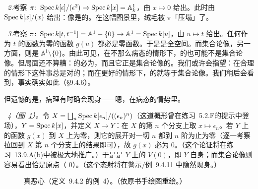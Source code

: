 \emph{\trhExample{}~2.}\quad 考察 $\pi\colon\operatorname{Spec} k[\epsilon]/(\epsilon^2)\to\operatorname{Spec} k[x]=\mathbb{A}^1_k$，由 $x\mapsto 0$ 给出。此时\trSchemeTheoreticImage{}由 $\operatorname{Spec} k[x]/(x)$ 给出：像是\trReduced{}的。在这幅图景里，绒毛被 $\pi$「压塌」了。

\emph{\trhExample{}~3.}\quad 考察 $\pi\colon\operatorname{Spec} k[t,t^{-1}]=\mathbb{A}^1-\{0\}\to\mathbb{A}^1=\operatorname{Spec} k[u]$，由 $u\mapsto t$ 给出。任何作为 $t$ 的函数\trPullback{}为零的函数 $g(u)$ 都必是零函数。于是\trSchemeTheoreticImage{}是全空间。而集合论像，另一方面，则是\trDistinguishedOpen{} $\mathbb{A}^1\setminus\{0\}$。由此可见，在不那么病态的情形下，\trSchemeTheoreticImage{}的\trUnderlyingSet{}也可能不是集合论像。但局面还不算糟：\trSchemeTheoreticImage{}的\trUnderlyingSet{}必为\trClosedSet，而且它正是集合论像的\trClosure。我们或许会指望：在合理的情形下这件事总是对的；而在更好的情形下，\trSchemeTheoreticImage{}的\trUnderlyingSet{}就等于集合论像。我们稍后会看到，事实确实如此（\S9.4.6）。

但遗憾的是，病理有时确会现身——嗯，在病态的情势里。

\emph{\trhExample{}~4（图~\ref{fig:yuck-fuzzy-point-image}）。}\quad 令 $X=\bigsqcup_n\operatorname{Spec} k[\epsilon_n]/((\epsilon_n)^n)$（这道概形曾在\mbox{练习~5.2.F}的提示中登场），$Y=\operatorname{Spec} k[x]$，并定义 $X\to Y$：在 $X$ 的第 $n$ 个分支上取 $x\mapsto\epsilon_n$。若 $Y$ 上的函数 $g(x)$ \trPullback{}到 $X$ 上为零，则它的\trTaylor{}展开对一切 $n$ 都到 $n$ 阶为止为零（逐一考察拉回到 $X$ 第 $n$ 个分支上的结果即可），故 $g(x)$ 必为 $0$。（这个论证将在\mbox{练习~13.9.A}(b)中被极大地推广。）于是\trSchemeTheoreticImage{}是 $Y$ 上的 $V(0)$，即 $Y$ 自身；而集合论像则容易看出恰是原点（\trClosedPoint{} $0$）。（这个态射将在警示/例~9.4.11 中隐然现身。）

\begin{figure}[htbp]
\centering
{}
\caption{真恶心（定义~9.4.2 的例~4）。（依原书手绘图重绘。）}\label{fig:yuck-fuzzy-point-image}
\end{figure}

